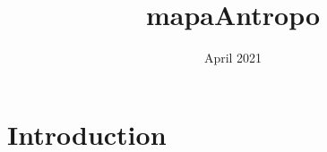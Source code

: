 \documentclass{article}
\title{mapaAntropo}
\author{ }
\date{April 2021}
\begin{document}
\maketitle

\section{Introduction}
\end{document}
